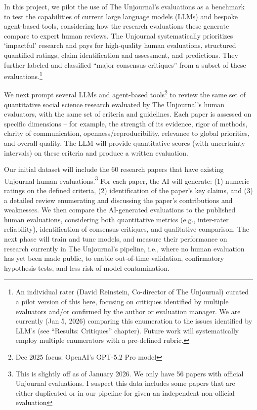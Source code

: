 \documentclass[
  11pt,
  letterpaper,
  DIV=11,
  numbers=noendperiod]{scrreprt}
\begin{document}
In this project, we pilot the use of The Unjournal's evaluations as a
benchmark to test the capabilities of current large language models
(LLMs) and bespoke agent-based tools, considering how the research
evaluations these generate compare to expert human reviews. The
Unjournal systematically prioritizes `impactful' research and pays for
high-quality human evaluations, structured quantified ratings, claim
identification and assessment, and predictions. They further labeled and
classified ``major consensus critiques'' from a subset of these
evaluations.\footnote{An individual rater (David Reinstein, Co-director
  of The Unjournal) curated a pilot version of this
  \href{https://coda.io/d/Unjournal-Public-Pages_ddIEzDONWdb/Piloting-a-benchmark-rubric-for-LLM-tools-Public_su7jCZTB\#_luqSuSgh}{here},
  focusing on critiques identified by multiple evaluators and/or
  confirmed by the author or evaluation manager. We are currently (Jan
  5, 2026) comparing this enumeration to the issues identified by LLM's
  (see ``Results: Critiques'' chapter). Future work will systematically
  employ multiple enumerators with a pre-defined rubric.}

We next prompt several LLMs and agent-based tools\footnote{Dec 2025
  focus: OpenAI's GPT-5.2 Pro model} to review the same set of
quantitative social science research evaluated by The Unjournal's human
evaluators, with the same set of criteria and guidelines. Each paper is
assessed on specific dimensions -- for example, the strength of its
evidence, rigor of methods, clarity of communication,
openness/reproducibility, relevance to global priorities, and overall
quality. The LLM will provide quantitative scores (with uncertainty
intervals) on these criteria and produce a written evaluation.

Our initial dataset will include the 60 research papers that have
existing Unjournal human evaluations.\footnote{This is slightly off as
  of January 2026. We only have 56 papers with official Unjournal
  evaluations. I suspect this data includes some papers that are either
  duplicated or in our pipeline for given an independent non-official
  evaluation} For each paper, the AI will generate: (1) numeric ratings
on the defined criteria, (2) identification of the paper's key claims,
and (3) a detailed review enumerating and discussing the paper's
contributions and weaknesses. We then compare the AI-generated
evaluations to the published human evaluations, considering both
quantitative metrics (e.g., inter-rater reliability), identification of
consensus critiques, and qualitative comparison. The next phase will
train and tune models, and measure their performance on research
currently in The Unjournal's pipeline, i.e., where no human evaluation
has yet been made public, to enable out-of-time validation, confirmatory
hypothesis tests, and less risk of model contamination.
\end{document}

